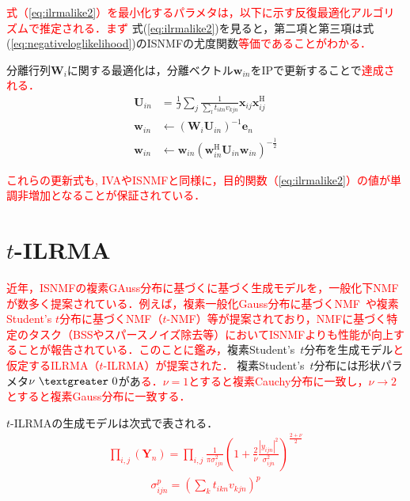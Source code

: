 \textcolor{red}{式（\ref{eq:ilrmalike2}）を最小化するパラメタは，以下に示す反復最適化アルゴリズムで推定される．まず}
式(\ref{eq:ilrmalike2})を見ると，第二項と第三項は式(\ref{eq:negativeloglikelihood})のISNMFの尤度関数\textcolor{red}{等価であることがわかる．}

分離行列$\bm{W}_i$に関する最適化は，分離ベクトル$\bm{w}_{in}$をIPで更新することで\textcolor{red}{達成される．}
\begin{align}
\bm{U}_{in} &= \frac{1}{J} \sum_j \frac{1}{\sum_{l}t_{ikn}v_{kjn}} \bm{x}_{ij} \bm{x}_{ij}^{\mathrm{H}} \label{eq:ip1} \\
\bm{w}_{in} &\leftarrow (\bm{W}_i \bm{U}_{in})^{-1} \bm{e}_n \label{eq:ip2} \\
\bm{w}_{in} &\leftarrow \bm{w}_{in} ( \bm{w}_{in}^{\mathrm{H}} \bm{U}_{in} \bm{w}_{in} )^{-\frac{1}{2}} \label{eq:ip3}
\end{align}

\textcolor{red}{これらの更新式も, IVAやISNMFと同様に，目的関数（\ref{eq:ilrmalike2}）の値が単調非増加となることが保証されている．}


\section{$t$-ILRMA}
\label{sec:conv:tilrma}

\textcolor{red}{近年，ISNMFの複素GAuss分布に基づくに基づく生成モデルを，一般化下NMFが数多く提案されている．例えば，複素一般化Gauss分布に基づくNMF~\cite{GGD}や複素Student's $t$分布に基づくNMF（$t$-NMF）\cite{tnmf}等が提案されており，NMFに基づく特定のタスク（BSSやスパースノイズ除去等）においてISNMFよりも性能が向上することが報告されている．このことに鑑み，}複素Student's~$t$分布を生成モデル\textcolor{red}{と仮定するILRMA（$t$-ILRMA）が提案された\cite{tdist1, tdist2}．}
複素Student's~$t$分布には形状パラメタ$\nu~\textgreater~0$があ\textcolor{red}{る．$\nu=1$とすると複素Cauchy分布に一致し，$\nu\rightarrow2$とすると複素Gauss分布に一致する．}

$t$-ILRMAの生成モデルは次式で表される．
\textcolor{red}{
\begin{align}
     \prod_{i,j}\left(\bm{Y}_{n}\right)= \prod_{i,j}\frac{1}{\pi \sigma_{ijn}^{2} } \left( 1+\frac{2}{\nu}\frac{|y_{ijn}|^2}{\sigma_{ijn}^{2}} \right)^{\frac{2+\nu}{2}}　\label{eq:tmodel}
\end{align}
\begin{align}
     \sigma_{ijn}^{p}=\left(\sum_{k}t_{ikn}v_{kjn}\right)^{p} \label{eq:tsigma}
\end{align}}

